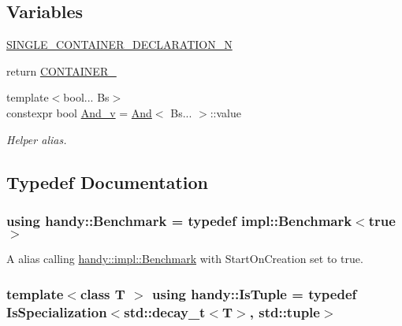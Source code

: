 \subsection*{Variables}
\begin{DoxyCompactItemize}
\item 
\hyperlink{namespacehandy_a0bbcc72407282157424193da360bfa2b}{S\+I\+N\+G\+L\+E\+\_\+\+C\+O\+N\+T\+A\+I\+N\+E\+R\+\_\+\+D\+E\+C\+L\+A\+R\+A\+T\+I\+O\+N\+\_\+N}
\item 
return \hyperlink{namespacehandy_a233c0491c05c437359a4404cd9b94fcc}{C\+O\+N\+T\+A\+I\+N\+E\+R\+\_}
\item 
{\footnotesize template$<$bool... Bs$>$ }\\constexpr bool \hyperlink{group__AndGroup_ga0b8333d82725fa020f74b5eee7016dbc}{And\+\_\+v} = \hyperlink{structhandy_1_1And}{And}$<$ Bs... $>$\+::value
\begin{DoxyCompactList}\small\item\em Helper alias. \end{DoxyCompactList}\end{DoxyCompactItemize}


\subsection{Typedef Documentation}
\subsubsection[{\texorpdfstring{Benchmark}{Benchmark}}]{\setlength{\rightskip}{0pt plus 5cm}using {\bf handy\+::\+Benchmark} = typedef {\bf impl\+::\+Benchmark}$<$true$>$}\hypertarget{namespacehandy_a921823a1a59f12ce0c0ded12503b0544}{}\label{namespacehandy_a921823a1a59f12ce0c0ded12503b0544}


A alias calling \hyperlink{classhandy_1_1impl_1_1Benchmark}{handy\+::impl\+::\+Benchmark} with {\ttfamily Start\+On\+Creation} set to {\ttfamily true}. 

\subsubsection[{\texorpdfstring{Is\+Tuple}{IsTuple}}]{\setlength{\rightskip}{0pt plus 5cm}template$<$class T $>$ using {\bf handy\+::\+Is\+Tuple} = typedef {\bf Is\+Specialization}$<$std\+::decay\+\_\+t$<$T$>$, {\bf std\+::tuple}$>$}\hypertarget{namespacehandy_ac98a0603f9c31f7601694077feba70ec}{}\label{namespacehandy_ac98a0603f9c31f7601694077feba70ec}


